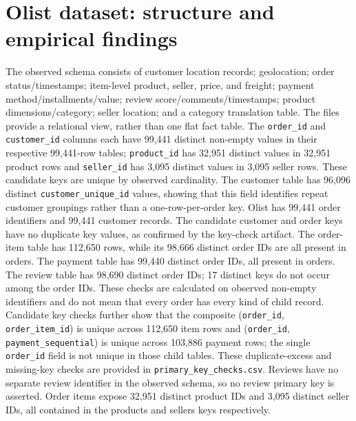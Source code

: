 \documentclass[11pt,a4paper]{article}
\begin{document}
\section{Olist dataset: structure and empirical findings}
The observed schema consists of customer location records; geolocation; order status/timestamps; item-level product, seller, price, and freight; payment method/installments/value; review score/comments/timestamps; product dimensions/category; seller location; and a category translation table. The files provide a relational view, rather than one flat fact table. The \texttt{order\_id} and \texttt{customer\_id} columns each have 99,441 distinct non-empty values in their respective 99,441-row tables; \texttt{product\_id} has 32,951 distinct values in 32,951 product rows and \texttt{seller\_id} has 3,095 distinct values in 3,095 seller rows. These candidate keys are unique by observed cardinality. The customer table has 96,096 distinct \texttt{customer\_unique\_id} values, showing that this field identifies repeat customer groupings rather than a one-row-per-order key. Olist has 99,441 order identifiers and 99,441 customer records. The candidate customer and order keys have no duplicate key values, as confirmed by the key-check artifact. The order-item table has 112,650 rows, while its 98,666 distinct order IDs are all present in orders. The payment table has 99,440 distinct order IDs, all present in orders. The review table has 98,690 distinct order IDs; 17 distinct keys do not occur among the order IDs. These checks are calculated on observed non-empty identifiers and do not mean that every order has every kind of child record. Candidate key checks further show that the composite (\texttt{order\_id}, \texttt{order\_item\_id}) is unique across 112,650 item rows and (\texttt{order\_id}, \texttt{payment\_sequential}) is unique across 103,886 payment rows; the single \texttt{order\_id} field is not unique in those child tables. These duplicate-excess and missing-key checks are provided in \texttt{primary\_key\_checks.csv}. Reviews have no separate review identifier in the observed schema, so no review primary key is asserted.  Order items expose 32,951 distinct product IDs and 3,095 distinct seller IDs, all contained in the products and sellers keys respectively.
\end{document}
